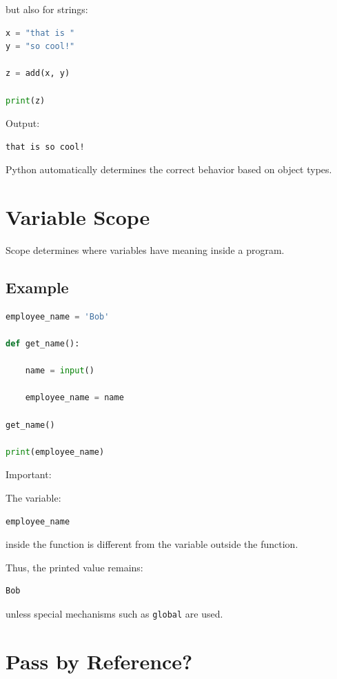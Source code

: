 \documentclass[11pt]{article}
\begin{document}
but also for strings:

\begin{lstlisting}[language=Python]
x = "that is "
y = "so cool!"

z = add(x, y)

print(z)
\end{lstlisting}

Output:

\begin{lstlisting}
that is so cool!
\end{lstlisting}

Python automatically determines the correct behavior based on object types.

\section{Variable Scope}

Scope determines where variables have meaning inside a program.

\subsection{Example}

\begin{lstlisting}[language=Python]
employee_name = 'Bob'

def get_name():

    name = input()

    employee_name = name

get_name()

print(employee_name)
\end{lstlisting}

Important:

The variable:

\begin{lstlisting}[language=Python]
employee_name
\end{lstlisting}

inside the function is different from the variable outside the function.

Thus, the printed value remains:

\begin{lstlisting}
Bob
\end{lstlisting}

unless special mechanisms such as \verb|global| are used.

\section{Pass by Reference?}
\end{document}
